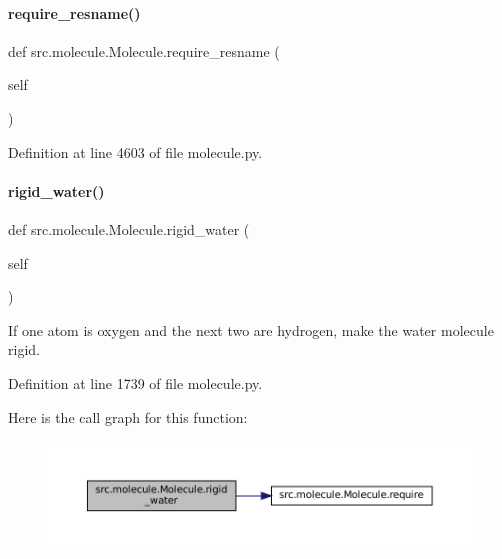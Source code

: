 \paragraph{\texorpdfstring{require\+\_\+resname()}{require\_resname()}}
{\footnotesize\ttfamily def src.\+molecule.\+Molecule.\+require\+\_\+resname (\begin{DoxyParamCaption}\item[{}]{self }\end{DoxyParamCaption})}



Definition at line 4603 of file molecule.\+py.

\mbox{\label{classsrc_1_1molecule_1_1Molecule_a6b6551ae13458225d8fc8d117112e23f}} 
\paragraph{\texorpdfstring{rigid\+\_\+water()}{rigid\_water()}}
{\footnotesize\ttfamily def src.\+molecule.\+Molecule.\+rigid\+\_\+water (\begin{DoxyParamCaption}\item[{}]{self }\end{DoxyParamCaption})}



If one atom is oxygen and the next two are hydrogen, make the water molecule rigid. 



Definition at line 1739 of file molecule.\+py.

Here is the call graph for this function\+:
\nopagebreak
\begin{figure}[H]
\begin{center}
\leavevmode
\includegraphics[width=350pt]{classsrc_1_1molecule_1_1Molecule_a6b6551ae13458225d8fc8d117112e23f_cgraph}
\end{center}
\end{figure}
\mbox{\label{classsrc_1_1molecule_1_1Molecule_ae8aa53ace87ec66daf8264b2add069c3}} 
